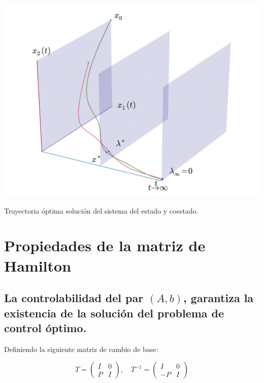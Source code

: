     \begin{marginfigure}
        \centering
        \includegraphics[width=\textwidth]{./imagenes/trayectorias3d.pdf}
        \caption{\label{fig:trayectoriaoptima}Trayectoria óptima solución del sistema del estado y coestado.}
    \end{marginfigure}


    \newpage
    \section{Propiedades de la matriz de Hamilton}


        \subsection{La controlabilidad del par $(A, b)$, garantiza la existencia de la solución del problema de control óptimo.}

            Definiendo la siguiente matriz de cambio de base:

            \begin{equation}
                T =
                \begin{pmatrix}
                    I & 0 \\
                    P & I
                \end{pmatrix}, \quad T^{-1} =
                \begin{pmatrix}
                    I & 0 \\
                    -P & I
                \end{pmatrix}
            \end{equation}

